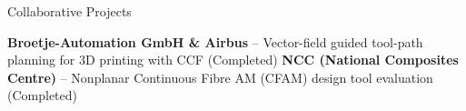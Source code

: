 \begin{rubric}{Collaborative Projects}

\entry*[]
  \textbf{Broetje-Automation GmbH \& Airbus} -- Vector-field guided tool-path planning for 3D printing with CCF (Completed)
%
\entry*[]
  \textbf{NCC (National Composites Centre)} -- Nonplanar Continuous Fibre AM (CFAM) design tool evaluation (Completed)
%

\end{rubric}

